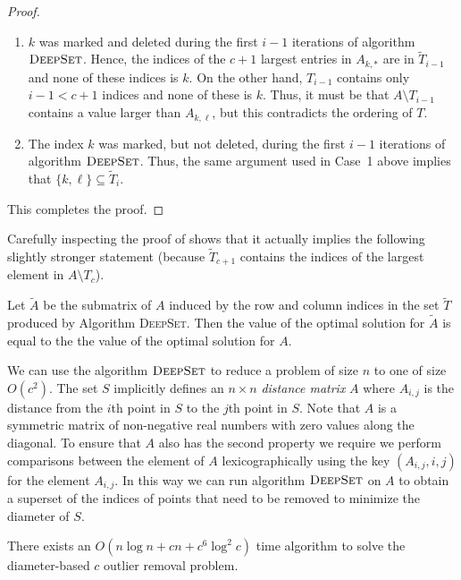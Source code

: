 \documentclass[lotsofwhite]{patmorin}
\begin{document}
\begin{proof}
\begin{enumerate}
\begin{enumerate}

\item $k$ was marked and deleted during the first $i-1$ iterations of
algorithm $\textsc{DeepSet}$. Hence, the indices of the $c+1$ largest
entries in $A_{k,*}$ are in $\tilde{T}_{i-1}$ and none of these
indices is $k$.  On the other hand, $T_{i-1}$ contains only $i-1 <
c+1$ indices and none of these is $k$.  Thus, it must be that
$A\setminus T_{i-1}$ contains a value larger than $A_{k,\ell}$, but this
contradicts the ordering of $T$.

\item The index $k$ was marked, but not deleted, during the first
$i-1$ iterations of algorithm $\textsc{DeepSet}$.  Thus, the same
argument used in Case~1 above implies that $\{k,\ell\}\subseteq
\tilde{T}_i$.

\end{enumerate}
\end{enumerate}
This completes the proof.
\end{proof} 

Carefully inspecting the proof of  shows that it
actually implies the following slightly stronger statement (because
$\tilde{T}_{c+1}$ contains the indices of the largest element in
$A\setminus T_c$).

\begin{lem}
Let $\tilde{A}$ be the submatrix of $A$ induced by the row and column
indices in the set $\tilde{T}$ produced by Algorithm \textsc{DeepSet}.
Then the value of the optimal solution for $\tilde{A}$ is equal to the
the value of the optimal solution for $A$.
\end{lem}

We can use the algorithm $\textsc{DeepSet}$ to reduce a problem of
size $n$ to one of size $O(c^2)$.  The set $S$ implicitly defines an
$n\times n$ \emph{distance matrix} $A$ where $A_{i,j}$ is the distance
from the $i$th point in $S$ to the $j$th point in $S$.  Note that $A$
is a symmetric matrix of non-negative real numbers with zero values
along the diagonal.  To ensure that $A$ also has the second property
we require we perform comparisons between the element of $A$
lexicographically using the key $(A_{i,j}, i, j)$ for the element
$A_{i,j}$.  In this way we can run algorithm $\textsc{DeepSet}$ on $A$
to obtain a superset of the indices of points that need to be removed
to minimize the diameter of $S$.

\begin{lem}
There exists an $O(n\log n + cn + c^6\log^2 c)$ time algorithm to
solve the diameter-based $c$ outlier removal problem.
\end{lem}
\end{document}
